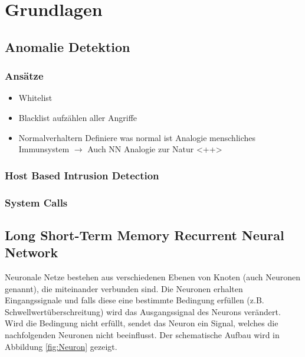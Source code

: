 \chapter{Grundlagen}\label{ch:grundlagen}
   
    \section{Anomalie Detektion}
        \subsection{Ansätze}
            \begin{itemize}
                \item Whitelist
                \item Blacklist
                    \subitem aufzählen aller Angriffe
                \item Normalverhaltern
                    \subitem Definiere was normal ist
                    \subitem Analogie menschliches Immunsystem
                    $\rightarrow$ Auch NN Analogie zur Natur <++> 
            \end{itemize}
        \subsection{Host Based Intrusion Detection}
        \subsection{System Calls}

    \section{Long Short-Term Memory Recurrent Neural Network}
    
    Neuronale Netze bestehen aus verschiedenen Ebenen von Knoten (auch Neuronen genannt), die miteinander verbunden sind. Die Neuronen erhalten Eingangssignale und falls diese eine bestimmte Bedingung erfüllen (z.B. Schwellwertüberschreitung) wird das Ausgangssignal des Neurons verändert.
        Wird die Bedingung nicht erfüllt, sendet das Neuron ein Signal, welches die nachfolgenden Neuronen nicht beeinflusst. Der schematische Aufbau wird in Abbildung \ref{fig:Neuron} gezeigt.

